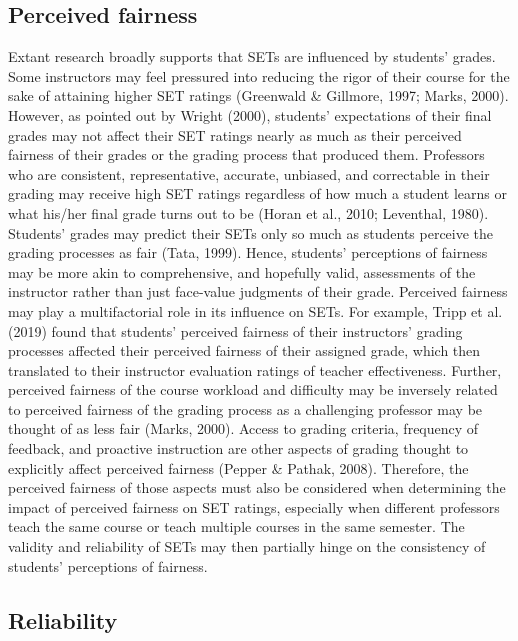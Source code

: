 \documentclass[
  man]{apa7}
\begin{document}
\hypertarget{perceived-fairness}{%
\subsection{Perceived fairness}\label{perceived-fairness}}

Extant research broadly supports that SETs are influenced by students'
grades. Some instructors may feel pressured into reducing the rigor of
their course for the sake of attaining higher SET ratings
(Greenwald \& Gillmore, 1997; Marks, 2000). However, as pointed out by Wright (2000),
students' expectations of their final grades may not affect their SET
ratings nearly as much as their perceived fairness of their grades or
the grading process that produced them. Professors who are consistent,
representative, accurate, unbiased, and correctable in their grading may
receive high SET ratings regardless of how much a student learns or what
his/her final grade turns out to be (Horan et al., 2010; Leventhal, 1980).
Students' grades may predict their SETs only so much as students
perceive the grading processes as fair (Tata, 1999). Hence, students'
perceptions of fairness may be more akin to comprehensive, and hopefully
valid, assessments of the instructor rather than just face-value
judgments of their grade. Perceived fairness may play a multifactorial
role in its influence on SETs. For example, Tripp et al. (2019) found that
students' perceived fairness of their instructors' grading processes
affected their perceived fairness of their assigned grade, which then
translated to their instructor evaluation ratings of teacher
effectiveness. Further, perceived fairness of the course workload and
difficulty may be inversely related to perceived fairness of the grading
process as a challenging professor may be thought of as less fair
(Marks, 2000). Access to grading criteria, frequency of feedback, and
proactive instruction are other aspects of grading thought to explicitly
affect perceived fairness (Pepper \& Pathak, 2008). Therefore, the perceived
fairness of those aspects must also be considered when determining the
impact of perceived fairness on SET ratings, especially when different
professors teach the same course or teach multiple courses in the same
semester. The validity and reliability of SETs may then partially hinge
on the consistency of students' perceptions of fairness.

\hypertarget{reliability}{%
\subsection{Reliability}\label{reliability}}
\end{document}
